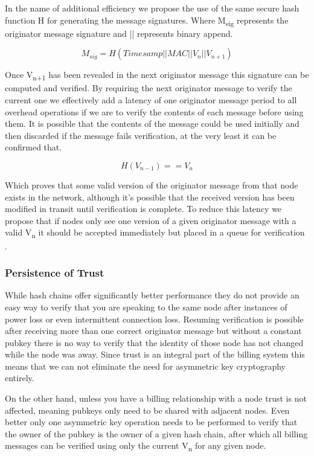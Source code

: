 \documentclass[11pt]{article}
\begin{document}
               
               In the name of additional efficiency we propose the use of the same secure hash function H for generating the message signatures. Where M\textsubscript{sig} represents the originator message signature and || represents binary append.
               
               \[M_{sig} = H(Timesamp||MAC||V_n||V_{n+1})\]
               
               Once V\textsubscript{n+1} has been revealed in the next originator message this signature can be computed and verified. By requiring the next originator message to verify the current one we effectively add a latency of one originator message period to all overhead operations if we are to verify the contents of each message before using them. It is possible that the contents of the message could be used initially and then discarded if the message fails verification, at the very least it can be confirmed that.
                     
                     \[H(V_{n-1}) == V_n\]
                     
               Which proves that some valid version of the originator message from that node exists in the network, although it's possible that the received version has been modified in transit until verification is complete. To reduce this latency we propose that if nodes only see one version of a given originator message with a valid V\textsubscript{n} it should be accepted immediately but placed in a queue for verification \cite{spins,hash}.
               
               \subsubsection{Persistence of Trust}
               
                      While hash chains offer significantly better performance they do not provide an easy way to verify that you are speaking to the same node after instances of power loss or even intermittent connection loss. Resuming verification is possible after receiving more than one correct originator message but without a constant pubkey there is no way to verify that the identity of those node has not changed while the node was away. Since trust is an integral part of the billing system this means that we can not eliminate the need for asymmetric key cryptography entirely. 
                      
                      On the other hand, unless you have a billing relationship with a node trust is not affected, meaning pubkeys only need to be shared with adjacent nodes. Even better only one asymmetric key operation needs to be performed to verify that the owner of the pubkey is the owner of a given hash chain, after which all billing messages can be verified using only the current V\textsubscript{n} for any given node.
               
\end{document}
